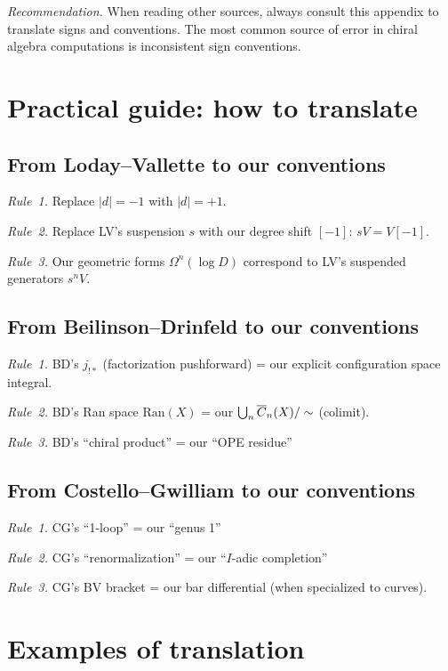 \emph{Recommendation.} When reading other sources, always consult this appendix to translate signs and conventions. The most common source of error in chiral algebra computations is inconsistent sign conventions.

\section{Practical guide: how to translate}

\subsection{From Loday--Vallette to our conventions}

\emph{Rule~1.} Replace $|d| = -1$ with $|d| = +1$.

\emph{Rule~2.} Replace LV's suspension $s$ with our degree shift $[-1]$: $sV = V[-1]$.

\emph{Rule~3.} Our geometric forms $\Omega^n(\log D)$ correspond to LV's suspended generators $s^n V$.

\subsection{From Beilinson--Drinfeld to our conventions}

\emph{Rule~1.} BD's $j_{!*}$ (factorization pushforward) = our explicit configuration space integral.

\emph{Rule~2.} BD's Ran space $\text{Ran}(X)$ = our $\bigcup_n \overline{C}_{n}(X) / \sim$ (colimit).

\emph{Rule~3.} BD's ``chiral product'' = our ``OPE residue''

\subsection{From Costello--Gwilliam to our conventions}

\emph{Rule~1.} CG's ``1-loop'' = our ``genus 1''

\emph{Rule~2.} CG's ``renormalization'' = our ``$I$-adic completion''

\emph{Rule~3.} CG's BV bracket = our bar differential (when specialized to curves).

\section{Examples of translation}

